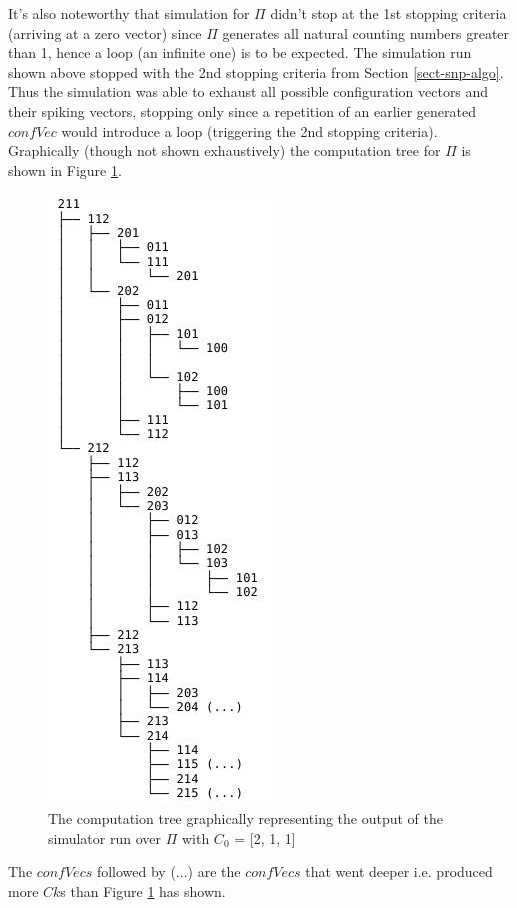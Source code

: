 \documentclass{acm_proc_article-sp}
\begin{document}
 It's also noteworthy that simulation for $\Pi$ didn't stop at the 1st stopping criteria (arriving at a zero vector) since $\Pi$ generates  all natural counting numbers greater than 1, hence a loop (an infinite one) is to be expected. The simulation run shown above stopped with the 2nd stopping criteria from Section \ref{sect-snp-algo}. Thus the simulation was able to exhaust all possible configuration vectors and their spiking vectors, stopping only since a repetition of an earlier generated $confVec$ would introduce a loop (triggering the 2nd stopping criteria).
Graphically (though not shown exhaustively) the computation tree for $\Pi$ is shown in Figure \ref{c211_tree}.

	\begin{figure}
		\centering
		\includegraphics[scale=.7]{c211_tree.jpeg} 
		\caption{The computation tree graphically representing the output of the simulator run over $\Pi$ with $C_0$ = [2, 1, 1]}
		\label{c211_tree}
	\end{figure}

The $confVecs$ followed by (...) are the $confVecs$ that went deeper i.e. produced more $Ck$s than Figure \ref{c211_tree} has shown.
\end{document}
